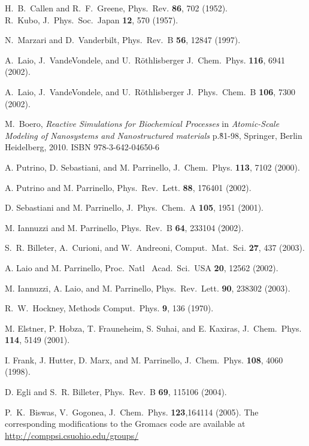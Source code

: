 \documentclass[twoside,10pt,titlepage,a4paper]{article}
\newcommand{\htref}[2]{\href{#1}{#2}}
\newcommand{\htref}[2]{\htmladdnormallink{#2}{#1}}
\begin{document}
\begin{thebibliography}{999}
    H.~B.~Callen and R.~F.~Greene, Phys.~Rev. {\bf 86}, 702 (1952).\\
    R.~Kubo, J.~Phys.~Soc.~Japan {\bf 12}, 570 (1957). 

    N.~Marzari and D.~Vanderbilt,
    Phys.~Rev.~B {\bf 56}, 12847 (1997).

    A.~Laio, J.~VandeVondele, and U.~R\"othlisberger
    J.~Chem.~Phys. {\bf 116}, 6941 (2002).

    A.~Laio, J.~VandeVondele, and U.~R\"othlisberger
    J.~Phys.~Chem.~B {\bf 106}, 7300 (2002).

    M.~Boero, {\it Reactive Simulations for Biochemical Processes}
    in {\em Atomic-Scale Modeling of Nanosystems and
    Nanostructured materials} p.\~81-98, Springer,
    Berlin Heidelberg, 2010. ISBN 978-3-642-04650-6

 A. Putrino, D. Sebastiani, and M. Parrinello,
     J.~Chem.~Phys. {\bf 113}, 7102 (2000).

 A. Putrino and M. Parrinello,
     Phys.~Rev.~Lett. {\bf 88}, 176401 (2002).

 D. Sebastiani and M. Parrinello,
     J.~Phys.~Chem.~A {\bf 105}, 1951 (2001).

 M. Iannuzzi and M. Parrinello,
      Phys.~Rev.~B {\bf 64}, 233104 (2002).

    S.~R. Billeter, A.~Curioni, and W.~Andreoni,
    Comput.~Mat.~Sci. {\bf 27}, 437 (2003).

 A. Laio and M. Parrinello,
      Proc.~Natl~ Acad.~Sci.~USA {\bf 20}, 12562 (2002).

  M. Iannuzzi, A. Laio, and M. Parrinello,
      Phys.~Rev.~Lett. {\bf 90}, 238302 (2003).

    R.~W.~Hockney, Methods Comput.~Phys. {\bf 9}, 136 (1970).

   M. Elstner, P. Hobza, T. Frauneheim, S. Suhai, and
   E. Kaxiras,  J.~Chem.~Phys. {\bf 114}, 5149 (2001).

    I. Frank, J. Hutter, D. Marx, and M. Parrinello,
    J.~Chem.~Phys. {\bf 108}, 4060 (1998).

    D. Egli and S.~R. Billeter,
    Phys.~Rev.~B {\bf 69}, 115106 (2004).

 P.~K.~Biswas, V.~Gogonea,
    J.~Chem.~Phys. {\bf 123},164114 (2005).
    The corresponding modifications to the Gromacs code are available at
\htref{http://comppsi.csuohio.edu/groups/}{http://comppsi.csuohio.edu/groups/}


\end{thebibliography}
\end{document}
